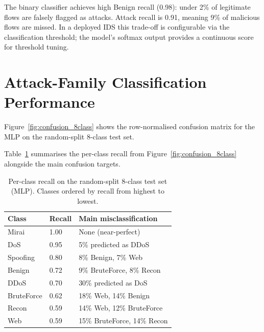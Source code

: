 \par The binary classifier achieves high Benign recall (0.98): under 2\% of legitimate flows are falsely flagged as attacks. Attack recall is 0.91, meaning 9\% of malicious flows are missed. In a deployed IDS this trade-off is configurable via the classification threshold; the model's softmax output provides a continuous score for threshold tuning.

\section{Attack-Family Classification Performance}
\label{sec:multiclass_results}

\par Figure~\ref{fig:confusion_8class} shows the row-normalised confusion matrix for the MLP on the random-split 8-class test set.

\par Table~\ref{tab:recall_8class} summarises the per-class recall from Figure~\ref{fig:confusion_8class} alongside the main confusion targets.

\begin{table}[htbp]
\begin{center}
\begin{tabular}{|p{70pt}|p{50pt}|p{230pt}|}
\hline
\textbf{Class} & \textbf{Recall} & \textbf{Main misclassification} \\
\hline
\hline Mirai & 1.00 & None (near-perfect) \\
\hline DoS & 0.95 & 5\% predicted as DDoS \\
\hline Spoofing & 0.80 & 8\% Benign, 7\% Web \\
\hline Benign & 0.72 & 9\% BruteForce, 8\% Recon \\
\hline DDoS & 0.70 & 30\% predicted as DoS \\
\hline BruteForce & 0.62 & 18\% Web, 14\% Benign \\
\hline Recon & 0.59 & 14\% Web, 12\% BruteForce \\
\hline Web & 0.59 & 15\% BruteForce, 14\% Recon \\
\hline
\end{tabular}
\end{center}
\caption{Per-class recall on the random-split 8-class test set (MLP). Classes ordered by recall from highest to lowest.}
\label{tab:recall_8class}
\end{table}

